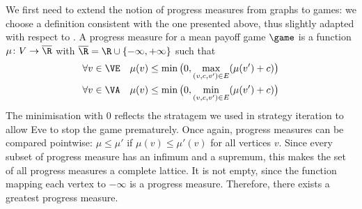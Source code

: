 We first need to extend the notion of progress measures from graphs to
games: we choose a definition consistent with the one presented above,
thus slightly adapted with respect to
\cite{Brim&Chaloupka&Doyen&Gentilini&Raskin:2011}. A progress measure
for a mean payoff game $\game$ is a function $\mu\colon V\to \Rbar$ with
$\Rbar = \R\cup\{-\infty,+\infty\}$ such that
\begin{align*}
  \forall v\in\VE\quad \mu(v)&\leq
                               \min\big(0,\max_{(v,c,v')\in E}(\mu(v')+c)\big)\\
  \forall v\in\VA\quad \mu(v)&\leq \min\big(0, \min_{(v,c,v')\in E}(\mu(v')+c)\big)
\end{align*}
The minimisation with $0$ reflects the stratagem we used in strategy
iteration to allow Eve to stop the game prematurely. Once again,
progress measures can be compared pointwise: $\mu\leq \mu'$ if
$\mu(v)\leq \mu'(v)$ for all vertices $v$. Since every subset of
progress measure has an infimum and a supremum, this makes the set of
all progress measures a complete lattice. It is not empty, since the
function mapping each vertex to $-\infty$ is a progress
measure. Therefore, there exists a greatest progress measure.


